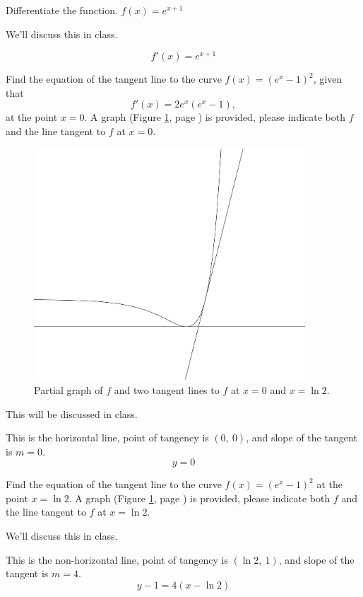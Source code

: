 \documentclass[12pt,addpoints, answers, fleqn]{exam}
\begin{document}
\begin{questions}
\question Differentiate the function.
$ \displaystyle f \left( x \right) = e^{x+1}$

\begin{solution}
We'll discuss this in class.

\[
 f' \left( x \right) = e^{x+1}
\]
\end{solution}

\question Find the equation of the tangent line to the curve $ \displaystyle f \left( x \right) = \left( e^x - 1 \right)^2$, given that
\[
f' \left( x \right) = 2 e^x \left( e^x - 1 \right),
\] at the point $x=0$. A graph (Figure \ref{fig:graph1005}, page \pageref{fig:graph1005}) is provided, please indicate both $f$ and the line tangent to $f$ at $x=0$.
\begin{figure}[htbp] %
   \centering
   \includegraphics[width=4in]{./graphics/graph1005.pdf} 
   \caption{Partial graph of $f$ and two tangent lines to $f$ at $x=0$ and $x=\ln 2$.}
   \label{fig:graph1005}
\end{figure}

\begin{solution}
This will be discussed in class.

This is the horizontal line, point of tangency is $\left( 0, \ 0 \right)$, and slope of the tangent is $m=0$.
\[
y = 0
\]
\end{solution}

\question Find the equation of the tangent line to the curve $ \displaystyle f \left( x \right) = \left( e^x - 1 \right)^2$ at the point $x=\ln 2$. A graph (Figure \ref{fig:graph1005}, page \pageref{fig:graph1005}) is provided, please indicate both $f$ and the line tangent to $f$ at $x= \ln 2$.


\begin{solution}
We'll discuss this in class.

This is the non-horizontal line, point of tangency is $\left( \ln 2, \ 1 \right)$, and slope of the tangent is $m=4$.
\[
y -1 = 4 \left( x - \ln 2 \right)
\]
\end{solution}



\end{questions}
\end{document}
